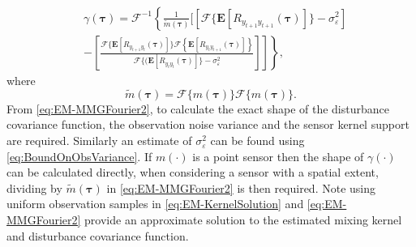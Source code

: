\documentclass[10pt,twocolumn,twoside]{IEEEtran}
\begin{document}
\begin{align}\label{eq:EM-MMGFourier2}
	&\gamma(\boldsymbol\tau) =\mathcal{F}^{-1}\left\lbrace \frac{1}{\tilde{m}(\boldsymbol\tau)}\Bigg[\left[\mathcal{F}\{\mathbf{E}[R_{y_{t+1}y_{t+1}}(\boldsymbol{\tau})]\}-\sigma_{\varepsilon}^2\right] \nonumber \right.\\
 &\left. \left.- \left[\frac{\mathcal{F}\{\mathbf{E}[R_{y_{t+1}y_t}(\boldsymbol{\tau})]\}\mathcal{F}\left\{\mathbf{E}\left[R_{y_ty_{t+1}}(\boldsymbol\tau)\right] \right\}}{\mathcal{F}\{(\mathbf{E}\left[R_{y_ty_t}(\boldsymbol\tau)\right]\} - \sigma_{\varepsilon}^2}\right]\right]\right\rbrace,
\end{align}
where
\begin{equation}
 \tilde{m}(\boldsymbol\tau)=\mathcal{F}\{m(\boldsymbol\tau)\}\mathcal{F}\{m(\boldsymbol\tau)\}.
\end{equation}
From \eqref{eq:EM-MMGFourier2}, to calculate the exact shape of the disturbance covariance function, the observation noise variance and the sensor kernel support are required. Similarly an estimate  of $\sigma_{\varepsilon}^2$ can be found using \eqref{eq:BoundOnObsVariance}. If $m(\cdot)$ is a point sensor then the shape of $\gamma(\cdot)$ can be calculated directly, when considering a sensor with a spatial extent, dividing by $\tilde{m}(\boldsymbol\tau)$ in \eqref{eq:EM-MMGFourier2} is then required. 
Note using uniform observation samples in \eqref{eq:EM-KernelSolution} and \eqref{eq:EM-MMGFourier2} provide an approximate solution to the estimated  mixing kernel and disturbance covariance function.
\end{document}
